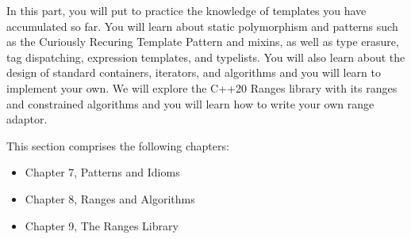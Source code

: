 In this part, you will put to practice the knowledge of templates you have accumulated so far. You will learn about static polymorphism and patterns such as the Curiously Recuring Template Pattern and mixins, as well as type erasure, tag dispatching, expression templates, and typelists. You will also learn about the design of standard containers, iterators, and algorithms and you will learn to implement your own. We will explore the C++20 Ranges library with its ranges and constrained algorithms and you will learn how to write your own range adaptor.

This section comprises the following chapters:

\begin{itemize}
\item
Chapter 7, Patterns and Idioms

\item
Chapter 8, Ranges and Algorithms

\item
Chapter 9, The Ranges Library
\end{itemize}